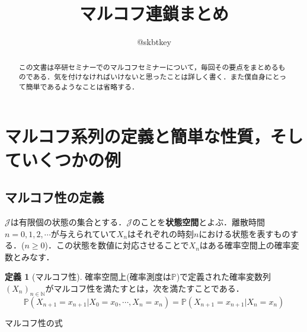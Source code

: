 \documentclass[12pt, a4paper]{jsarticle}
\title{マルコフ連鎖まとめ}
\author{@skbtkey}
\date{}
\theoremstyle{definition}
\newtheorem{defn}{定義}[section]
\newcommand{\NN}{{\mathbb{N}}} %
\begin{document}
\maketitle
\begin{abstract}
この文書は卒研セミナーでのマルコフセミナーについて，毎回その要点をまとめるものである．気を付けなければいけないと思ったことは詳しく書く．また僕自身にとって簡単であるようなことは省略する．
\end{abstract}

\section{マルコフ系列の定義と簡単な性質，そしていくつかの例}

\subsection{マルコフ性の定義}
$\mathcal{J}$は有限個の状態の集合とする．$\mathcal{J}$のことを{\bf 状態空間}とよぶ．離散時間$n = 0,1,2,\cdots$が与えられていて$X_n$はそれぞれの時刻$n$における状態を表すものする．($n \ge 0$)．この状態を数値に対応させることで$X_n$はある確率空間上の確率変数とみなす．
\begin{screen}
	\begin{defn}[マルコフ性]
		確率空間上(確率測度は$\mathbb{P}$)で定義された確率変数列$(X_n)_{n \in \NN}$がマルコフ性を満たすとは，次を満たすことである．
		\[\mathbb{P}(X_{n+1} = x_{n+1} | X_0 = x_0 , \cdots , X_n = x_n) = \mathbb{P}(X_{n+1} = x_{n+1} | X_n = x_n)\]
	\end{defn}
\end{screen}

マルコフ性の式
\end{document}
